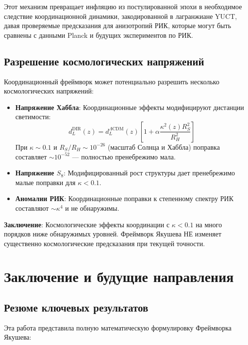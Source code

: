 \documentclass[11pt,a4paper]{article}
\begin{document}
	Этот механизм превращает инфляцию из постулированной эпохи в необходимое следствие координационной динамики, закодированной в лагранжиане YUCT, давая проверяемые предсказания для анизотропий РИК, которые могут быть сравнены с данными Planck и будущих экспериментов по РИК.
	
	\subsection{Разрешение космологических напряжений}
	
	Координационный фреймворк может потенциально разрешить несколько космологических напряжений:
	
	\begin{itemize}
		\item \textbf{Напряжение Хаббла}: Координационные эффекты модифицируют дистанции светимости:
		\begin{equation}
			d_L^{\text{DIR}}(z) = d_L^{\Lambda\text{CDM}}(z) \left[ 1 + \alpha \frac{\kappa^2(z) R_S^2}{R_H^2} \right]
		\end{equation}
		При $\kappa \sim 0.1$ и $R_S/R_H \sim 10^{-26}$ (масштаб Солнца и Хаббла) поправка составляет $\sim 10^{-52}$ — полностью пренебрежимо мала.
		
		\item \textbf{Напряжение $S_8$}: Модифицированный рост структуры дает пренебрежимо малые поправки для $\kappa < 0.1$.
		
		\item \textbf{Аномалии РИК}: Координационные поправки к степенному спектру РИК составляют $\sim \kappa^4$ и не обнаружимы.
	\end{itemize}
	
	\textbf{Заключение}: Космологические эффекты координации с $\kappa < 0.1$ на много порядков ниже обнаружимых уровней. Фреймворк Якушева НЕ изменяет существенно космологические предсказания при текущей точности.
	
	\section{Заключение и будущие направления}
	\subsection{Резюме ключевых результатов}
	
	Эта работа представила полную математическую формулировку Фреймворка Якушева:
	
\end{document}

